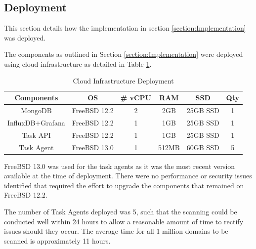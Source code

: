 \documentclass{mscreport}
\begin{document}
\clearpage
\newpage

\subsection{Deployment}

This section details how the implementation in section \ref{section:Implementation} was deployed.

\vspace{0.3cm} \noindent
The components as outlined in Section \ref{section:Implementation} were deployed using cloud infrastructure as detailed in Table \ref{table:implmentation_cloud}.

\begin{table}[H]
  \begin{center}
    \begin{tabular}{|c|c|c|c|c|c|}  %
      \hline
      \textbf{Components} & \textbf{OS} & \textbf{\# vCPU} & \textbf{RAM} & \textbf{SSD} & \textbf{Qty}\\
      \hline
      MongoDB & FreeBSD 12.2 & 2 & 2GB & 25GB SSD & 1 \\
      \hline
      InfluxDB$+$Grafana & FreeBSD 12.2 & 1 & 1GB & 25GB SSD & 1 \\
      \hline
      Task API & FreeBSD 12.2 & 1 & 1GB & 25GB SSD & 1 \\
      \hline
      Task Agent & FreeBSD 13.0 & 1 & 512MB & 60GB SSD & 5 \\
      \hline
    \end{tabular}
    \caption{Cloud Infrastructure Deployment}
    \label{table:implmentation_cloud} %
  \end{center}
\end{table}

\noindent
FreeBSD 13.0 was used for the task agents as it was the most recent version available at the time of deployment. There were no performance or security issues identified that required the effort to upgrade the components that remained on FreeBSD 12.2.

\vspace{0.3cm} \noindent
The number of Task Agents deployed was 5, such that the scanning could be conducted well within 24 hours to allow a reasonable amount of time to rectify issues should they occur. The average time for all 1 million domains to be scanned is approximately 11 hours.
\end{document}
